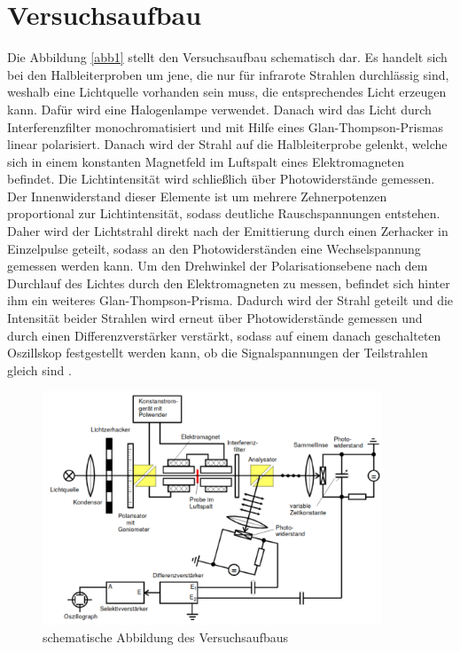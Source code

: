 \section{Versuchsaufbau}
\label{sec:Durchführung}

Die Abbildung \ref{abb1} stellt den Versuchsaufbau schematisch dar.
Es handelt sich bei den Halbleiterproben um jene, die nur 
für infrarote Strahlen durchlässig sind, weshalb eine Lichtquelle vorhanden sein 
muss, die entsprechendes Licht erzeugen kann.
Dafür wird eine Halogenlampe verwendet. 
Danach wird das Licht durch Interferenzfilter monochromatisiert und mit Hilfe eines 
Glan-Thompson-Prismas linear polarisiert. Danach wird der Strahl auf die 
Halbleiterprobe gelenkt, welche sich in einem konstanten Magnetfeld im Luftspalt 
eines Elektromagneten befindet. Die Lichtintensität wird schließlich über 
Photowiderstände gemessen. Der Innenwiderstand dieser Elemente ist um mehrere 
Zehnerpotenzen proportional zur Lichtintensität, sodass deutliche 
Rauschspannungen entstehen. Daher wird der Lichtstrahl direkt nach der 
Emittierung durch einen Zerhacker in Einzelpulse geteilt, sodass an den 
Photowiderständen eine Wechselspannung gemessen werden kann. 
Um den Drehwinkel der Polarisationsebene nach dem Durchlauf des Lichtes durch den 
Elektromagneten zu messen, befindet sich hinter ihm ein weiteres Glan-Thompson-Prisma.
Dadurch wird der Strahl geteilt und die Intensität beider Strahlen wird erneut 
über Photowiderstände gemessen und durch einen Differenzverstärker verstärkt,
sodass auf einem danach geschalteten Oszillskop festgestellt werden kann, ob die 
Signalspannungen der Teilstrahlen gleich sind \cite{sample}.

\begin{figure}
    \centering
    \includegraphics[width=0.9\textwidth]{figure/Aufbau.pdf}
    \caption{schematische Abbildung des Versuchsaufbaus \cite{sample}}
    \label{abb2}
\end{figure}

